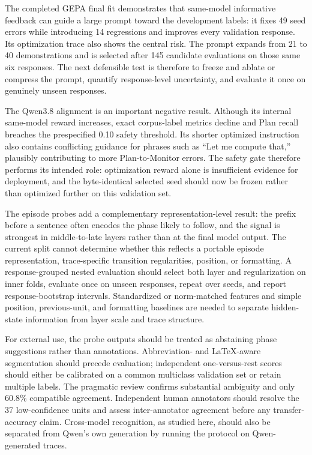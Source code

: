 The completed GEPA final fit demonstrates that same-model informative feedback
can guide a large prompt toward the development labels: it fixes 49 seed
errors while introducing 14 regressions and improves every validation
response.  Its optimization trace also shows the central risk.  The prompt
expands from 21 to 40 demonstrations and is selected after 145 candidate
evaluations on those same six responses.  The next defensible test is therefore
to freeze and ablate or compress the prompt, quantify response-level
uncertainty, and evaluate it once on genuinely unseen responses.

The Qwen3.8 alignment is an important negative result.  Although its internal
same-model reward increases, exact corpus-label metrics decline and Plan
recall breaches the prespecified 0.10 safety threshold.  Its shorter optimized
instruction also contains conflicting guidance for phrases such as ``Let me
compute that,'' plausibly contributing to more Plan-to-Monitor errors.  The
safety gate therefore performs its intended role: optimization reward alone
is insufficient evidence for deployment, and the byte-identical selected seed
should now be frozen rather than optimized further on this validation set.

The episode probes add a complementary representation-level result: the
prefix before a sentence often encodes the phase likely to follow, and the
signal is strongest in middle-to-late layers rather than at the final model
output.  The current split cannot determine whether this reflects a portable
episode representation, trace-specific transition regularities, position, or
formatting.  A response-grouped nested evaluation should select both layer
and regularization on inner folds, evaluate once on unseen responses, repeat
over seeds, and report response-bootstrap intervals.  Standardized or
norm-matched features and simple position, previous-unit, and formatting
baselines are needed to separate hidden-state information from layer scale and
trace structure.

For external use, the probe outputs should be treated as abstaining phase
suggestions rather than annotations.  Abbreviation- and LaTeX-aware
segmentation should precede evaluation; independent one-versus-rest scores
should either be calibrated on a common multiclass validation set or retain
multiple labels.  The pragmatic review confirms substantial ambiguity and
only 60.8\% compatible agreement.  Independent human annotators should resolve
the 37 low-confidence units and assess inter-annotator agreement before any
transfer-accuracy claim.  Cross-model recognition, as studied here, should
also be separated from Qwen's own generation by running the protocol on
Qwen-generated traces.

